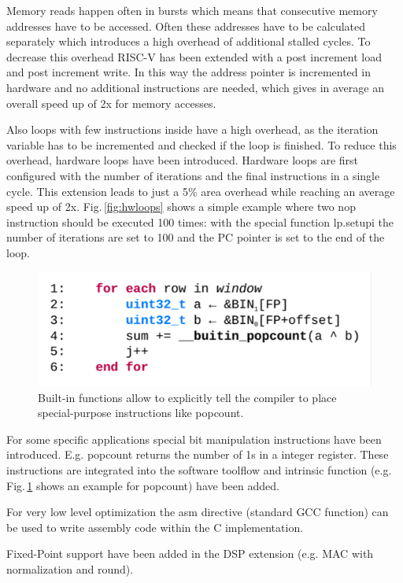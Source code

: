 Memory reads happen often in bursts which means that consecutive memory addresses have to be accessed. Often these addresses have to be calculated separately which introduces a high overhead of additional stalled cycles. To decrease this overhead RISC-V has been extended with a post increment load and post increment write. In this way the address pointer is incremented in hardware and no additional instructions are needed, which gives in average an overall speed up of 2x for memory accesses.

Also loops with few instructions inside have a high overhead, as the iteration variable has to be incremented and checked if the loop is finished. To reduce this overhead,  hardware loops have been introduced. Hardware loops are first configured with the number of iterations and the final instructions in a single cycle. This extension leads to just a 5\% area overhead while reaching an average speed up of 2x. Fig.\,\ref{fig:hwloops} shows a simple example where two nop instruction should be executed 100 times: with the special function lp.setupi the number of iterations are set to 100 and the PC pointer is set to the end of the loop.



\begin{figure}[h]
    \centering
    \includegraphics[width=.5\textwidth]{figures/builtin.png}
    \caption{Built-in functions allow to explicitly tell the compiler to place special-purpose instructions like popcount.}
    \label{fig:builtin}
\end{figure}

For some specific applications special bit manipulation instructions have been introduced. E.g. popcount returns the number of 1s in a integer register. These instructions are integrated into the software toolflow and intrinsic function (e.g. Fig.\,\ref{fig:builtin} shows an example for popcount) have been added.

For very low level optimization the asm directive (standard GCC function)  can be used to write assembly code within the C implementation.

Fixed-Point support have been added in the DSP extension (e.g. MAC with normalization and round).

